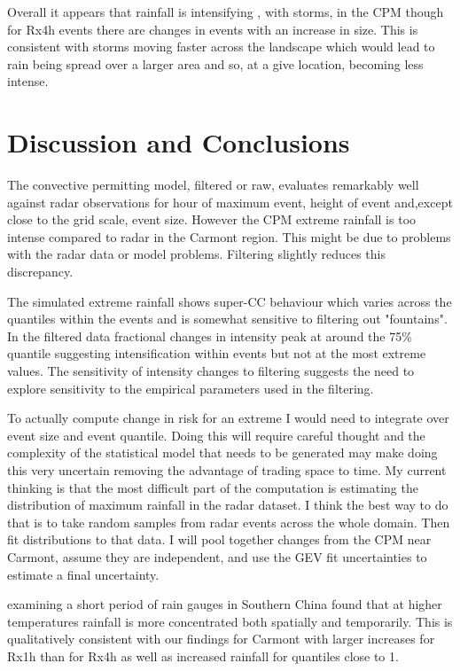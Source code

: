 \documentclass[11pt,a4paper]{article}
\begin{document}
 Overall it appears that rainfall is intensifying , with storms, in the CPM though for Rx4h events there are changes in events with an increase in size. This is consistent with storms moving faster across the landscape which would lead to rain being spread over a larger area and so, at a give location, becoming less intense. 


\section{Discussion and Conclusions}
The convective permitting model, filtered or raw, evaluates remarkably well against radar observations for hour of maximum event, height of event and,except close to the grid scale, event size. However the CPM extreme rainfall is too intense compared to radar in the Carmont region. This might be due to problems with the radar data or model problems.  Filtering slightly reduces this discrepancy. 



The simulated extreme rainfall shows super-CC behaviour  which varies across the quantiles within the events and is somewhat sensitive to filtering out "fountains". In the filtered data fractional changes in intensity peak at around the 75\% quantile suggesting intensification within events but not at the most extreme values. The sensitivity of intensity changes to filtering suggests the need to explore sensitivity to the empirical parameters used in the filtering.
 
 
 To actually  compute change in risk for an extreme I would need to integrate over event size and event quantile. Doing this will require careful thought and the complexity of the statistical model  that needs to be generated may make doing this very uncertain removing the advantage of trading space to time.  My current thinking is that the most difficult part of the computation is estimating the distribution of maximum rainfall in the radar dataset. I think the best way to do that is to take random samples from radar events across the whole domain. Then fit distributions to that data.  I will pool together changes from the CPM near Carmont, assume they are independent, and use the GEV fit  uncertainties to estimate a final uncertainty. 

   \cite{long2021rainfall_conc} examining a short period of rain gauges in Southern China found that at higher temperatures rainfall is more concentrated both spatially and temporarily. This is qualitatively consistent with our findings for Carmont with larger increases for Rx1h than for Rx4h as well as increased rainfall for quantiles close to 1.
\end{document}
